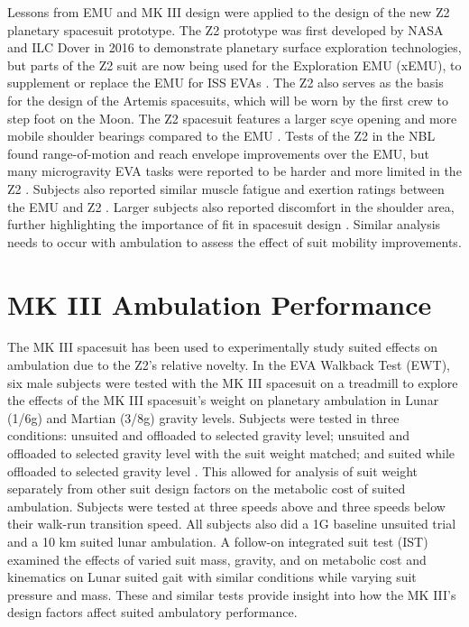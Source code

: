 \documentclass[defaultstyle,11pt]{comps}
\begin{document}
Lessons from EMU and MK III design were applied to the design of the new Z2 planetary spacesuit prototype.
The Z2 prototype was first developed by NASA and ILC Dover in 2016 to demonstrate planetary surface exploration technologies, but parts of the Z2 suit are now being used for the Exploration EMU (xEMU), to supplement or replace the EMU for ISS EVAs \citep{Graziosi2016, Meginnis2018}.
The Z2 also serves as the basis for the design of the Artemis spacesuits, which will be worn by the first crew to step foot on the Moon.
The Z2 spacesuit features a larger scye opening and more mobile shoulder bearings compared to the EMU \citep{Graziosi2016}.
Tests of the Z2 in the NBL found range-of-motion and reach envelope improvements over the EMU, but many microgravity EVA tasks were reported to be harder and more limited in the Z2 \citep{Meginnis2018}.
Subjects also reported similar muscle fatigue and exertion ratings between the EMU and Z2 \citep{Meginnis2018}.
Larger subjects also reported discomfort in the shoulder area, further highlighting the importance of fit in spacesuit design \citep{Meginnis2018}.
Similar analysis needs to occur with ambulation to assess the effect of suit mobility improvements.

\hypertarget{mk-iii-ambulation-performance}{%
\section{MK III Ambulation Performance}\label{mk-iii-ambulation-performance}}

The MK III spacesuit has been used to experimentally study suited effects on ambulation due to the Z2's relative novelty.
In the EVA Walkback Test (EWT), six male subjects were tested with the MK III spacesuit on a treadmill to explore the effects of the MK III spacesuit's weight on planetary ambulation in Lunar (1/6g) and Martian (3/8g) gravity levels.
Subjects were tested in three conditions: unsuited and offloaded to selected gravity level; unsuited and offloaded to selected gravity level with the suit weight matched; and suited while offloaded to selected gravity level \citep{Norcross2009}.
This allowed for analysis of suit weight separately from other suit design factors on the metabolic cost of suited ambulation.
Subjects were tested at three speeds above and three speeds below their walk-run transition speed.
All subjects also did a 1G baseline unsuited trial and a 10 km suited lunar ambulation.
A follow-on integrated suit test (IST) examined the effects of varied suit mass, gravity, and on metabolic cost and kinematics on Lunar suited gait \citep{Norcross2010} with similar conditions while varying suit pressure and mass.
These and similar tests provide insight into how the MK III's design factors affect suited ambulatory performance.
\end{document}
